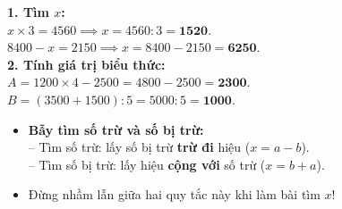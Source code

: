 \documentclass[11pt,a4paper]{article}
\begin{document}
\vspace{-2.5mm}
\noindent
\begin{minipage}[t]{0.49\textwidth}\vspace{0pt}
\begin{tcolorbox}[
  enhanced,
  colback=green!4!white,
  colframe=green!60!black,
  arc=2mm, boxrule=0.8pt,
  left=2mm, right=2mm, top=1.8mm, bottom=1.8mm,
  title={\footnotesize\bfseries\color{white}\faCheckCircle\ Ví dụ thực hành chuẩn mực}
]
{\footnotesize
\textbf{1. Tìm $x$:}\\
$x \times 3 = 4560 \implies x = 4560 : 3 = \mathbf{1520}$.\\
$8400 - x = 2150 \implies x = 8400 - 2150 = \mathbf{6250}$.\\
\textbf{2. Tính giá trị biểu thức:}\\
$A = 1200 \times 4 - 2500 = 4800 - 2500 = \mathbf{2300}$.\\
$B = (3500 + 1500) : 5 = 5000 : 5 = \mathbf{1000}$.
}
\end{tcolorbox}
\end{minipage}
\hfill
\begin{minipage}[t]{0.49\textwidth}\vspace{0pt}
\begin{tcolorbox}[
  enhanced,
  colback=red!4!white,
  colframe=red!70!black,
  arc=2mm, boxrule=0.8pt,
  left=2mm, right=2mm, top=1.8mm, bottom=1.8mm,
  title={\footnotesize\bfseries\color{white}\faExclamationTriangle\ Mẹo tránh bẫy trắc nghiệm}
]
{\footnotesize
\begin{itemize}\setlength{\itemsep}{1.5pt}\setlength{\leftskip}{-2.5mm}
  \item \textbf{Bẫy tìm số trừ và số bị trừ:}\\
  -- Tìm số trừ: lấy số bị trừ \textbf{trừ đi} hiệu ($x = a - b$).\\
  -- Tìm số bị trừ: lấy hiệu \textbf{cộng với} số trừ ($x = b + a$).
  \item Đừng nhầm lẫn giữa hai quy tắc này khi làm bài tìm $x$!
\end{itemize}
}
\end{tcolorbox}
\end{minipage}
\end{document}
